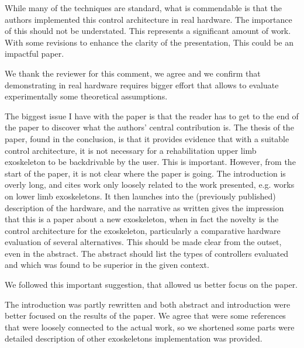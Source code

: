 

\begin{point}
While many of the techniques are standard, what is commendable is that
the authors implemented this control architecture in real hardware. The
importance of this should not be understated. This represents a
significant amount of work. With some revisions to enhance the clarity
of the presentation, This could be an impactful paper.
\end{point}

\begin{reply}
	We thank the reviewer for this comment, we agree and we confirm that demonstrating in real hardware requires bigger effort that allows to evaluate experimentally some theoretical assumptions.
	
\end{reply}


\begin{point}

The biggest issue I have with the paper is that the reader has to get
to the end of the paper to discover what the authors' central
contribution is. The thesis of the paper, found in the conclusion, is
that it provides evidence that with a suitable control architecture, it
is not necessary for a rehabilitation upper limb exoskeleton to be
backdrivable by the user. This is important. However, from the start of
the paper, it is not clear where the paper is going. The introduction
is overly long, and cites work only loosely related to the work
presented, e.g. works on lower limb exoskeletons. It then launches into
the (previously published) description of the hardware, and the
narrative as written gives the impression that this is a paper about a
new exoskeleton, when in fact the novelty is the control architecture
for the exoskeleton, particularly a comparative hardware evaluation of
several alternatives. This should be made clear from the outset, even
in the abstract. The abstract should list the types of controllers
evaluated and which was found to be superior in the given context.
\end{point}


\begin{reply}
We followed this important suggestion, that allowed us better focus on the paper.

The introduction was partly rewritten and both abstract and introduction were better focused on the results of the paper.
We agree that were some references that were loosely connected to the actual work, so we shortened some parts were detailed description of other exoskeletons implementation was provided.
\end{reply}


